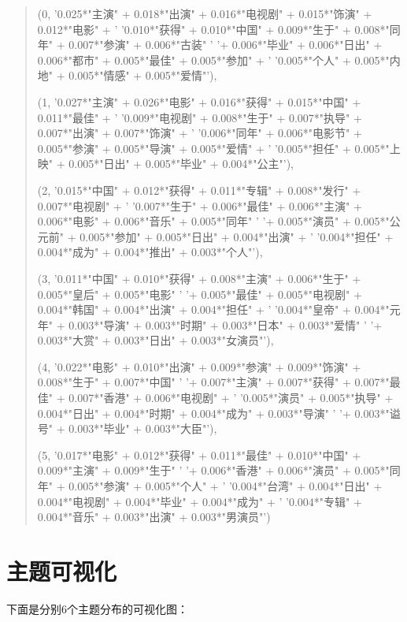 \documentclass{article} [NO-DEFAULT-PACKAGES] \usepackage{wx672hyperref}
\begin{document}
\begin{quotation}
(0,
  '0.025*"主演" + 0.018*"出演" + 0.016*"电视剧" + 0.015*"饰演" + 0.012*"电影" + '
  '0.010*"获得" + 0.010*"中国" + 0.009*"生于" + 0.008*"同年" + 0.007*"参演" + 0.006*"古装" '
  '+ 0.006*"毕业" + 0.006*"日出" + 0.006*"都市" + 0.005*"最佳" + 0.005*"参加" + '
  '0.005*"个人" + 0.005*"内地" + 0.005*"情感" + 0.005*"爱情"'),
  
 (1,
  '0.027*"主演" + 0.026*"电影" + 0.016*"获得" + 0.015*"中国" + 0.011*"最佳" + '
  '0.009*"电视剧" + 0.008*"生于" + 0.007*"执导" + 0.007*"出演" + 0.007*"饰演" + '
  '0.006*"同年" + 0.006*"电影节" + 0.005*"参演" + 0.005*"导演" + 0.005*"爱情" + '
  '0.005*"担任" + 0.005*"上映" + 0.005*"日出" + 0.005*"毕业" + 0.004*"公主"'),
  
 (2,
  '0.015*"中国" + 0.012*"获得" + 0.011*"专辑" + 0.008*"发行" + 0.007*"电视剧" + '
  '0.007*"生于" + 0.006*"最佳" + 0.006*"主演" + 0.006*"电影" + 0.006*"音乐" + 0.005*"同年" '
  '+ 0.005*"演员" + 0.005*"公元前" + 0.005*"参加" + 0.005*"日出" + 0.004*"出演" + '
  '0.004*"担任" + 0.004*"成为" + 0.004*"推出" + 0.003*"个人"'),
  
 (3,
  '0.011*"中国" + 0.010*"获得" + 0.008*"主演" + 0.006*"生于" + 0.005*"皇后" + 0.005*"电影" '
  '+ 0.005*"最佳" + 0.005*"电视剧" + 0.004*"韩国" + 0.004*"出演" + 0.004*"担任" + '
  '0.004*"皇帝" + 0.004*"元年" + 0.003*"导演" + 0.003*"时期" + 0.003*"日本" + 0.003*"爱情" '
  '+ 0.003*"大赏" + 0.003*"日出" + 0.003*"女演员"'),
  
 (4,
  '0.022*"电影" + 0.010*"出演" + 0.009*"参演" + 0.009*"饰演" + 0.008*"生于" + 0.007*"中国" '
  '+ 0.007*"主演" + 0.007*"获得" + 0.007*"最佳" + 0.007*"香港" + 0.006*"电视剧" + '
  '0.005*"演员" + 0.005*"执导" + 0.004*"日出" + 0.004*"时期" + 0.004*"成为" + 0.003*"导演" '
  '+ 0.003*"谥号" + 0.003*"毕业" + 0.003*"大臣"'),
  
 (5,
  '0.017*"电影" + 0.012*"获得" + 0.011*"最佳" + 0.010*"中国" + 0.009*"主演" + 0.009*"生于" '
  '+ 0.006*"香港" + 0.006*"演员" + 0.005*"同年" + 0.005*"参演" + 0.005*"个人" + '
  '0.004*"台湾" + 0.004*"日出" + 0.004*"电视剧" + 0.004*"毕业" + 0.004*"成为" + '
  '0.004*"专辑" + 0.004*"音乐" + 0.003*"出演" + 0.003*"男演员"')
\end{quotation}

\section{主题可视化}
\label{sec:orgdb08b28}

下面是分别6个主题分布的可视化图：\\
\end{document}

